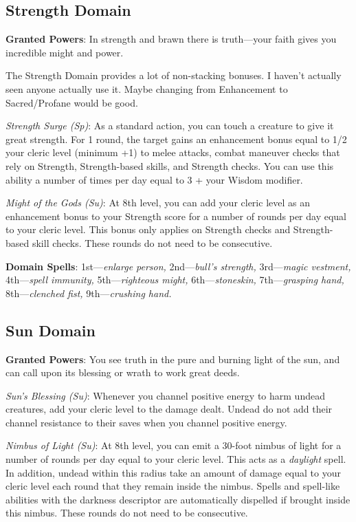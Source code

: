 \subsection{Strength Domain}


\textbf{Granted Powers}: In strength and brawn there is truth---your faith gives you incredible might and power. 
\begin{formal}
 The Strength Domain provides a lot of non-stacking bonuses. I haven't actually seen anyone actually use it.
 Maybe changing from Enhancement to Sacred/Profane would be good.
\end{formal}

\textit{Strength Surge (Sp)}: As a standard action, you can touch a creature to give it great strength. For 1 round,
the target gains an enhancement bonus equal to 1/2 your cleric level (minimum +1) to melee attacks, combat maneuver
checks that rely on Strength, Strength-based skills, and Strength checks. You can use this ability a number of times
per day equal to 3 + your Wisdom modifier.

\textit{Might of the Gods (Su)}: At 8th level, you can add your cleric level as an enhancement bonus to your
Strength score for a number of rounds per day equal to your cleric level. This bonus only applies on Strength 
checks and Strength-based skill checks. These rounds do not need to be consecutive.
				
\textbf{Domain Spells}: 1st---\textit{enlarge person, }2nd---\textit{bull's strength,} 3rd---\textit{magic vestment, }4th---\textit{spell immunity, }5th---\textit{righteous might, }6th---\textit{stoneskin, }7th---\textit{grasping hand, }8th---\textit{clenched fist, }9th---\textit{crushing hand.}
				
\subsection{Sun Domain}

				
\textbf{Granted Powers}: You see truth in the pure and burning light of the sun, and can call upon its blessing or
wrath to work great deeds.
				
\textit{Sun's Blessing (Su)}: Whenever you channel positive energy to harm undead creatures, add your cleric level
to the damage dealt. Undead do not add their channel resistance to their saves when you channel positive energy.


\textit{Nimbus of Light (Su)}: At 8th level, you can emit a 30-foot nimbus of light for a number of rounds per day
equal to your cleric level. This acts as a \textit{daylight }spell. In addition, undead within this radius take an
amount of damage equal to your cleric level each round that they remain inside the nimbus. Spells and spell-like
abilities with the darkness descriptor are automatically dispelled if brought inside this nimbus. These rounds do 
not need to be consecutive.
				
